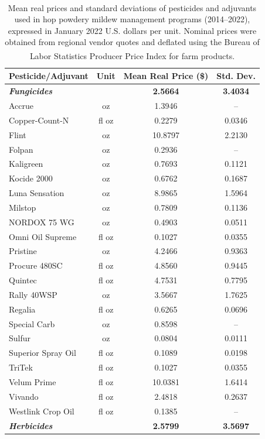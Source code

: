 \begin{table}[ht]
\centering
\caption{Mean real prices and standard deviations\textsuperscript{\ddag} of pesticides and adjuvants used in hop powdery mildew management programs (2014--2022), expressed in January 2022 U.S. dollars per unit. Nominal prices were obtained from regional vendor quotes and deflated using the Bureau of Labor Statistics Producer Price Index for farm products.\textsuperscript{\dag}}
\label{tab:S2_pesticides}
\footnotesize
\setlength{\tabcolsep}{4pt}
\begin{tabular}{lccc}
\hline
\textbf{Pesticide/Adjuvant} & \textbf{Unit} & \textbf{Mean Real Price (\$)} & \textbf{Std. Dev.} \\
\hline
\textbf{\textit{Fungicides}} & & \textbf{2.5664} & \textbf{3.4034} \\
\hline
Accrue & oz & 1.3946 & -- \\
Copper-Count-N & fl oz & 0.2279 & 0.0346 \\
Flint & oz & 10.8797 & 2.2130 \\
Folpan & oz & 0.2936 & -- \\
Kaligreen & oz & 0.7693 & 0.1121 \\
Kocide 2000 & oz & 0.6762 & 0.1687 \\
Luna Sensation & oz & 8.9865 & 1.5964 \\
Milstop & oz & 0.7809 & 0.1136 \\
NORDOX 75 WG & oz & 0.4903 & 0.0511 \\
Omni Oil Supreme & fl oz & 0.1027 & 0.0355 \\
Pristine & oz & 4.2466 & 0.9363 \\
Procure 480SC & fl oz & 4.8560 & 0.9445 \\
Quintec & fl oz & 4.7531 & 0.7795 \\
Rally 40WSP & oz & 3.5667 & 1.7625 \\
Regalia & fl oz & 0.6265 & 0.0696 \\
Special Carb & oz & 0.8598 & -- \\
Sulfur & oz & 0.0804 & 0.0111 \\
Superior Spray Oil & fl oz & 0.1089 & 0.0198 \\
TriTek & fl oz & 0.1027 & 0.0355 \\
Velum Prime & fl oz & 10.0381 & 1.6414 \\
Vivando & fl oz & 2.4818 & 0.2637 \\
Westlink Crop Oil & fl oz & 0.1385 & -- \\
\hline
\textbf{\textit{Herbicides}} & & \textbf{2.5799} & \textbf{3.5697} \\

\end{tabular}
\end{table}
